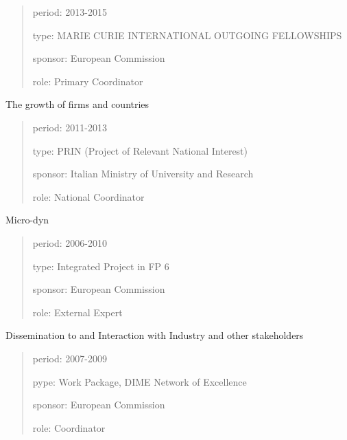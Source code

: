 \documentclass[a4paper]{article}
\newenvironment{DUfieldlist}%
    {\quote\description}
    {\enddescription\endquote}
\begin{document}
\begin{quote}
\begin{DUfieldlist}
\item[{period:}]
2013-2015

\item[{type:}]
MARIE CURIE INTERNATIONAL OUTGOING FELLOWSHIPS

\item[{sponsor:}]
European Commission

\item[{role:}]
Primary Coordinator
\end{DUfieldlist}
\end{quote}

The growth of firms and countries

\begin{quote}
\begin{DUfieldlist}
\item[{period:}]
2011-2013

\item[{type:}]
PRIN (Project of Relevant National Interest)

\item[{sponsor:}]
Italian Ministry of University and Research

\item[{role:}]
National Coordinator
\end{DUfieldlist}
\end{quote}

Micro-dyn

\begin{quote}
\begin{DUfieldlist}
\item[{period:}]
2006-2010

\item[{type:}]
Integrated Project in FP 6

\item[{sponsor:}]
European Commission

\item[{role:}]
External Expert
\end{DUfieldlist}
\end{quote}

Dissemination to and Interaction with Industry and other stakeholders

\begin{quote}
\begin{DUfieldlist}
\item[{period:}]
2007-2009

\item[{pype:}]
Work Package, DIME Network of Excellence

\item[{sponsor:}]
European Commission

\item[{role:}]
Coordinator
\end{DUfieldlist}
\end{quote}
\end{document}
